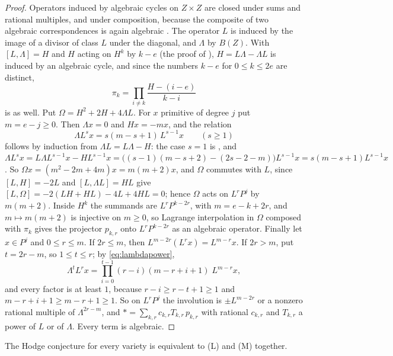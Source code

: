 \begin{proof}
Operators induced by algebraic cycles on $Z\times Z$ are closed under sums
and rational multiples, and under composition, because the composite of two
algebraic correspondences is again algebraic \cite{Kle68}. The operator $L$
is induced by the image of a divisor of class $L$ under the diagonal, and $\Lambda$ by $B(Z)$. With
$[L,\Lambda]=H$ and $H$ acting on $H^{k}$ by $k-e$ (the proof of
\cite[Lemma~10.7]{paperI}), $H=L\Lambda-\Lambda L$ is induced by an algebraic cycle,
and since the numbers $k-e$ for $0\le k\le 2e$ are distinct,
\[
  \pi_{k}=\prod_{i\ne k}\frac{H-(i-e)}{k-i}
\]
is as well. Put $\Omega=H^{2}+2H+4\Lambda L$. For $x$ primitive of degree
$j$ put $m=e-j\ge0$. Then $\Lambda x=0$ and $Hx=-mx$, and the relation
\begin{equation}\label{eq:lambdapower}
  \Lambda L^{s}x=s(m-s+1)\,L^{s-1}x\qquad(s\ge1)
\end{equation}
follows by induction from $\Lambda L=L\Lambda-H$: the case $s=1$ is
\cite[Lemma~10.7]{paperI}, and
$\Lambda L^{s}x=L\Lambda L^{s-1}x-HL^{s-1}x
=\bigl((s-1)(m-s+2)-(2s-2-m)\bigr)L^{s-1}x=s(m-s+1)L^{s-1}x$.
So $\Omega x=(m^{2}-2m+4m)x=m(m+2)x$, and $\Omega$ commutes with $L$, since
$[L,H]=-2L$ and $[L,\Lambda L]=HL$ give $[L,\Omega]=-2(LH+HL)-4L+4HL=0$;
hence $\Omega$ acts on $L^{r}P^{j}$ by $m(m+2)$. Inside $H^{k}$ the summands
are $L^{r}P^{k-2r}$, with $m=e-k+2r$, and $m\mapsto m(m+2)$ is injective on
$m\ge0$, so Lagrange interpolation in $\Omega$ composed with $\pi_{k}$ gives
the projector $p_{k,r}$ onto $L^{r}P^{k-2r}$ as an algebraic operator.
Finally let $x\in P^{j}$ and $0\le r\le m$. If $2r\le m$, then
$L^{m-2r}(L^{r}x)=L^{m-r}x$. If $2r>m$, put $t=2r-m$, so $1\le t\le r$;
by \eqref{eq:lambdapower},
\[
  \Lambda^{t}L^{r}x=\prod_{i=0}^{t-1}(r-i)(m-r+i+1)\;L^{m-r}x,
\]
and every factor is at least $1$, because $r-i\ge r-t+1\ge1$ and
$m-r+i+1\ge m-r+1\ge1$. So on $L^{r}P^{j}$ the involution is $\pm L^{m-2r}$
or a nonzero rational multiple of $\Lambda^{2r-m}$, and
${*}=\sum_{k,r}c_{k,r}T_{k,r}\,p_{k,r}$ with rational $c_{k,r}$ and
$T_{k,r}$ a power of $L$ or of $\Lambda$. Every term is algebraic.
\end{proof}

\begin{proposition}\label{prop:lefmot}
The Hodge conjecture for every variety is equivalent to \textup{(L)} and
\textup{(M)} together.
\end{proposition}

